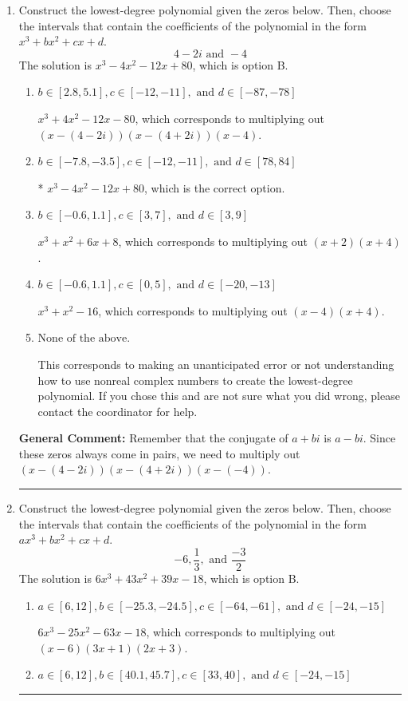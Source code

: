 \documentclass{extbook}[14pt]
\newcommand{\litem}[1]{\item #1

\rule{\textwidth}{0.4pt}}
\begin{document}
\begin{enumerate}\litem{
Construct the lowest-degree polynomial given the zeros below. Then, choose the intervals that contain the coefficients of the polynomial in the form $x^3+bx^2+cx+d$.
\[ 4 - 2 i \text{ and } -4 \]The solution is \( x^{3} -4 x^{2} -12 x + 80 \), which is option B.\begin{enumerate}[label=\Alph*.]
\item \( b \in [2.8, 5.1], c \in [-12, -11], \text{ and } d \in [-87, -78] \)

$x^{3} +4 x^{2} -12 x -80$, which corresponds to multiplying out $(x-(4 - 2 i))(x-(4 + 2 i))(x -4)$.
\item \( b \in [-7.8, -3.5], c \in [-12, -11], \text{ and } d \in [78, 84] \)

* $x^{3} -4 x^{2} -12 x + 80$, which is the correct option.
\item \( b \in [-0.6, 1.1], c \in [3, 7], \text{ and } d \in [3, 9] \)

$x^{3} + x^{2} +6 x + 8$, which corresponds to multiplying out $(x + 2)(x + 4)$.
\item \( b \in [-0.6, 1.1], c \in [0, 5], \text{ and } d \in [-20, -13] \)

$x^{3} + x^{2} -16$, which corresponds to multiplying out $(x -4)(x + 4)$.
\item \( \text{None of the above.} \)

This corresponds to making an unanticipated error or not understanding how to use nonreal complex numbers to create the lowest-degree polynomial. If you chose this and are not sure what you did wrong, please contact the coordinator for help.
\end{enumerate}

\textbf{General Comment:} Remember that the conjugate of $a+bi$ is $a-bi$. Since these zeros always come in pairs, we need to multiply out $(x-(4 - 2 i))(x-(4 + 2 i))(x-(-4))$.
}
\litem{
Construct the lowest-degree polynomial given the zeros below. Then, choose the intervals that contain the coefficients of the polynomial in the form $ax^3+bx^2+cx+d$.
\[ -6, \frac{1}{3}, \text{ and } \frac{-3}{2} \]The solution is \( 6x^{3} +43 x^{2} +39 x -18 \), which is option B.\begin{enumerate}[label=\Alph*.]
\item \( a \in [6, 12], b \in [-25.3, -24.5], c \in [-64, -61], \text{ and } d \in [-24, -15] \)

$6x^{3} -25 x^{2} -63 x -18$, which corresponds to multiplying out $(x -6)(3x + 1)(2x + 3)$.
\item \( a \in [6, 12], b \in [40.1, 45.7], c \in [33, 40], \text{ and } d \in [-24, -15] \)


\end{enumerate}}
\end{enumerate}
\end{document}
